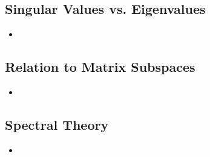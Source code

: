 \begin{itemize}
  \subsection{Singular Values vs. Eigenvalues}\label{Singular Values vs. Eigenvalues}
  \begin{itemize}
    \item 
  \end{itemize}

  \subsection{Relation to Matrix Subspaces}\label{SVD Relation to Subspaces}
  \begin{itemize}
    \item 
  \end{itemize}

  \subsection{Spectral Theory}\label{Spectral Theory}
  \begin{itemize}
    \item 
  \end{itemize}
  
\end{itemize}


